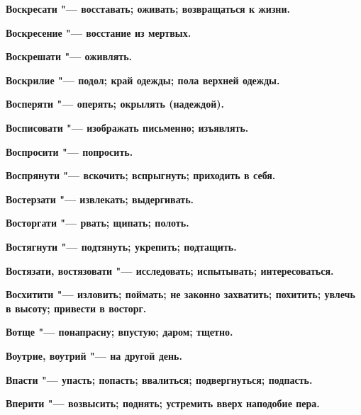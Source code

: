 \begin{mymulticols}{2}
\bfseries Воскресати\normalfont{} "--- восставать; оживать; возвращаться к жизни. 




\bfseries Воскресение\normalfont{} "--- восстание из мертвых. 




\bfseries Воскрешати\normalfont{} "--- оживлять. 




\bfseries Воскрилие\normalfont{} "--- подол; край одежды; пола верхней одежды. 




\bfseries Восперяти\normalfont{} "--- оперять; окрылять (надеждой). 




\bfseries Восписовати\normalfont{} "--- изображать письменно; изъявлять. 




\bfseries Воспросити\normalfont{} "--- попросить. 




\bfseries Воспрянути\normalfont{} "--- вскочить; вспрыгнуть; приходить в себя. 




\bfseries Востерзати\normalfont{} "--- извлекать; выдергивать. 




\bfseries Восторгати\normalfont{} "--- рвать; щипать; полоть. 




\bfseries Востягнути\normalfont{} "--- подтянуть; укрепить; подтащить. 




\bfseries Востязати, востязовати\normalfont{} "--- исследовать; испытывать; интересоваться. 




\bfseries Восхитити\normalfont{} "--- изловить; поймать; не законно захватить; похитить; увлечь в высоту; привести в восторг. 




\bfseries Вотще\normalfont{} "--- понапрасну; впустую; даром; тщетно. 




\bfseries Воутрие, воутрий\normalfont{} "--- на другой день. 




\bfseries Впасти\normalfont{} "--- упасть; попасть; ввалиться; подвергнуться; подпасть. 




\bfseries Вперити\normalfont{} "--- возвысить; поднять; устремить вверх наподобие пера. 





\end{mymulticols}
